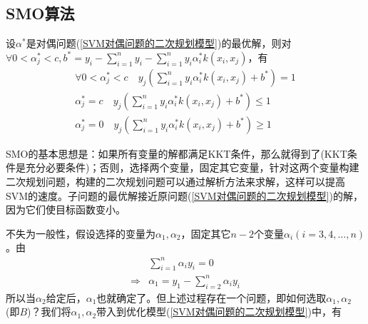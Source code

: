     \subsection{SMO算法}
        \par
        设$\alpha^*$是对偶问题(\ref{SVM对偶问题的二次规划模型})的最优解，则对$\forall 0< \alpha_j^* <c,b^* = y_i - \sum\limits_{i=1}^ny_i- \sum\limits_{i=1}^ny_i\alpha_i^* k(x_i,x_j)$，有
        \begin{align*}
        \forall 0< \alpha_j^* <c \quad y_j \left( \sum_{i=1}^n y_i\alpha_i^* k(x_i,x_j)+b^* \right)  = 1\\
         \alpha_j^* =c \quad y_j \left( \sum_{i=1}^n y_i\alpha_i^* k(x_i,x_j)+b^* \right)  \leqslant 1\\
         \alpha_j^* =0 \quad y_j \left( \sum_{i=1}^n y_i\alpha_i^* k(x_i,x_j)+b^* \right)  \geqslant 1
        \end{align*}
        \par
        SMO的基本思想是：如果所有变量的解都满足KKT条件，那么就得到了(KKT条件是充分必要条件)；否则，选择两个变量，固定其它变量，针对这两个变量构建二次规划问题，构建的二次规划问题可以通过解析方法来求解，这样可以提高SVM的速度。子问题的最优解接近原问题(\ref{SVM对偶问题的二次规划模型})的解，因为它们使目标函数变小。
        \par
        不失为一般性，假设选择的变量为$\alpha_1,\alpha_2$，固定其它$n-2$个变量$\alpha_i(i=3,4,\dots,n)$。由
        \begin{align*}
        &\sum_{i=1}^n \alpha_iy_i = 0\\
        \Rightarrow {}& \alpha_1 = y_1 - \sum_{i=2}^n\alpha_iy_i
        \end{align*}
        所以当$\alpha_2$给定后，$\alpha_1$也就确定了。但上述过程存在一个问题，即如何选取$\alpha_1,\alpha_2$(即$B$)？我们将$\alpha_1,\alpha_2$带入到优化模型(\ref{SVM对偶问题的二次规划模型})中，有
